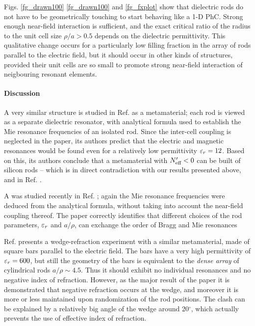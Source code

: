 Figs. \ref{fg_drawn100} \ref{fg_drawn100} and \ref{fg_fxplot} show that dielectric rods do not have to be geometrically touching to start behaving like a 1-D PhC. Strong enough near-field interaction is sufficient, and the exact critical ratio of the radius to the unit cell size $\rho/a > 0.5$ depends on the dielectric permittivity. This qualitative change occurs for a particularly low filling fraction in the array of rods parallel to the electric field, but it should occur in other kinds of structures, provided their unit cells are so small to promote strong near-field interaction of neigbouring resonant elements.
\paragraph{Discussion} %
A very similar structure  is studied in Ref. \cite{vynck2009all} as a metamaterial; each rod is viewed as a separate dielectric resonator, with analytical formula used to establish the Mie resonance frequencies of an isolated rod. Since the inter-cell coupling is neglected in the paper, its authors predict that the electric and magnetic resonances would be found even for a relatively low permittivity $\varepsilon_r = 12$. Based on this, its authors conclude that a metamaterial with $N_{\text{eff} }'<0$ can be built of silicon rods -- which is in direct contradiction with our results presented above, and in Ref. \cite{dominec2014transition}.

A was studied recently in Ref. \cite{rybin2014photonic}; again the Mie resonance frequencies were deduced from the analytical formula, without taking into account the near-field coupling thereof. The paper correctly identifies that different choices of the rod parameters, $\varepsilon_r$ and $a/\rho$, can exchange the order of Bragg and Mie resonances 


Ref. \cite{peng2007} presents a wedge-refraction experiment with a similar metamaterial, made of square bars parallel to the electric field. The bars have a very high permittivity of $\varepsilon_r=600$, but still the geometry of the bars is equivalent to the \textit{dense array} of cylindrical rods $a/\rho \sim 4.5$. Thus it should exhibit no individual resonances and no negative index of refraction. However, as the major result of the paper \cite[Fig. 3bc]{peng2007} it is demonstrated that negative refraction occurs at the wedge, and moreover it is more or less maintained upon randomization of the rod positions.
The clash can be explained by a relatively big angle of the wedge around 20$^\circ$, which actually prevents the use of effective index of refraction. %

